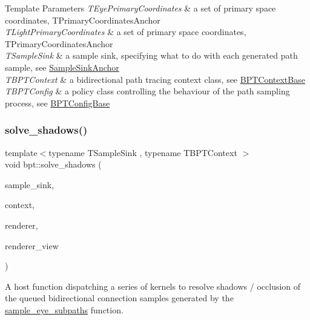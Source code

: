 \begin{DoxyTemplParams}{Template Parameters}
{\em T\+Eye\+Primary\+Coordinates} & a set of primary space coordinates, T\+Primary\+Coordinates\+Anchor \\
\hline
{\em T\+Light\+Primary\+Coordinates} & a set of primary space coordinates, T\+Primary\+Coordinates\+Anchor \\
\hline
{\em T\+Sample\+Sink} & a sample sink, specifying what to do with each generated path sample, see \hyperlink{struct_sample_sink_base_SampleSinkAnchor}{Sample\+Sink\+Anchor} \\
\hline
{\em T\+B\+P\+T\+Context} & a bidirectional path tracing context class, see \hyperlink{struct_b_p_t_context_base}{B\+P\+T\+Context\+Base} \\
\hline
{\em T\+B\+P\+T\+Config} & a policy class controlling the behaviour of the path sampling process, see \hyperlink{struct_b_p_t_config_base}{B\+P\+T\+Config\+Base} \\
\hline
\end{DoxyTemplParams}
\mbox{\label{group___b_p_t_lib_ga67c2c1dbc4ee8212daf3728fafe55969}} 
\subsubsection{\texorpdfstring{solve\+\_\+shadows()}{solve\_shadows()}}
{\footnotesize\ttfamily template$<$typename T\+Sample\+Sink , typename T\+B\+P\+T\+Context $>$ \\
void bpt\+::solve\+\_\+shadows (\begin{DoxyParamCaption}\item[{T\+Sample\+Sink}]{sample\+\_\+sink,  }\item[{T\+B\+P\+T\+Context \&}]{context,  }\item[{\hyperlink{struct_rendering_context}{Rendering\+Context} \&}]{renderer,  }\item[{\hyperlink{struct_rendering_context_view}{Rendering\+Context\+View} \&}]{renderer\+\_\+view }\end{DoxyParamCaption})}

\begin{DoxyParagraph}{}
A host function dispatching a series of kernels to resolve shadows / occlusion of the queued bidirectional connection samples generated by the \hyperlink{group___b_p_t_lib_ga5dcb245a5dfa3a0910069446d27aa8eb}{sample\+\_\+eye\+\_\+subpaths} function.
\end{DoxyParagraph}

